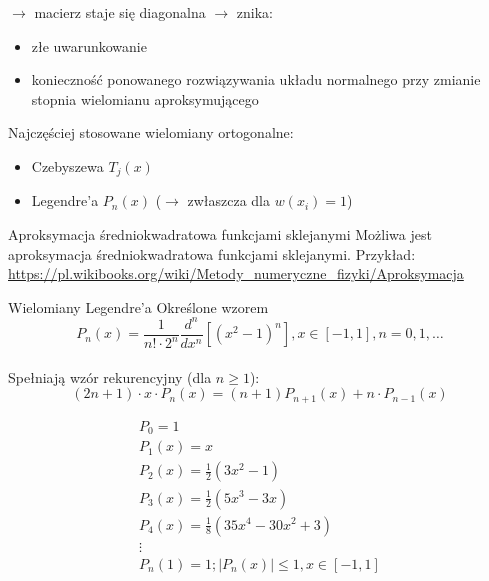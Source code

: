 \begin{frame}
	$\rightarrow$ macierz staje się diagonalna $\rightarrow$ znika:
    \begin{itemize}
    \item złe uwarunkowanie
    \item konieczność ponowanego rozwiązywania układu normalnego przy zmianie stopnia wielomianu aproksymującego
    \end{itemize}
	Najczęściej stosowane wielomiany ortogonalne:
    \begin{itemize}
    \item Czebyszewa $T_j(x)$
    \item Legendre'a $P_n(x)$ ($\rightarrow$ zwłaszcza dla $w(x_i) = 1$)
    \end{itemize}
\end{frame}
\begin{frame}{Aproksymacja średniokwadratowa funkcjami sklejanymi}
	Możliwa jest aproksymacja średniokwadratowa funkcjami sklejanymi.\newline
    \newline
    Przykład: \url{https://pl.wikibooks.org/wiki/Metody_numeryczne_fizyki/Aproksymacja}
\end{frame}
\begin{frame}{Wielomiany Legendre'a}
	Określone wzorem $$P_n(x) = \frac{1}{n! \cdot 2^n}\frac{d^n}{dx^n}[(x^{2}-1)^n], x \in [-1,1], n = 0,1,\ldots$$\\
    Spełniają wzór rekurencyjny (dla $n\geqslant1$):
    $$(2n+1) \cdot x \cdot P_n(x)=(n+1)P_{n+1}(x)+n \cdot P_{n-1}(x)$$
    \begin{flushleft}
    	$$\left.\begin{array}{l}
    P_0 = 1 \\
    P_1(x) = x \\
    P_2(x) = \frac{1}{2}(3x^2-1)\\
    P_3(x) = \frac{1}{2}(5x^3-3x) \\
    P_4(x) = \frac{1}{8}(35x^4-30x^2+3)\\
    \vdots \\
    P_n(1) = 1; |P_n(x)| \leqslant 1, x \in [-1,1]
    \end{array}\right.$$
    \end{flushleft}
\end{frame}
